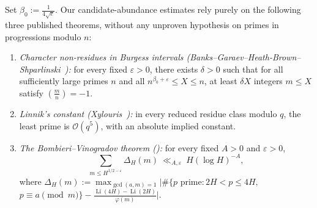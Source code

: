 \documentclass[11pt, a4paper]{article}
\theoremstyle{plain}
\theoremstyle{definition}
\newcommand{\leg}[2]{\left(\frac{#1}{#2}\right)}
\DeclareMathOperator{\Li}{Li}
\begin{document}
Set $\beta_0:=\frac{1}{4\sqrt{e}}$. Our candidate-abundance estimates rely purely on the following three published theorems, without any unproven hypothesis on primes in progressions modulo $n$:
\begin{enumerate}[1.]
    \item \emph{Character non-residues in Burgess intervals (Banks--Garaev--Heath-Brown--Shparlinski~\cite{BGHS}):} for every fixed $\varepsilon>0$, there exists $\delta>0$ such that for all sufficiently large primes $n$ and all $n^{\beta_0+\varepsilon}\le X\le n$, at least $\delta X$ integers $m\le X$ satisfy $\leg{m}{n}=-1$.
    \item \emph{Linnik's constant (Xylouris~\cite{xylouris2011}):} in every reduced residue class modulo $q$, the least prime is $\mathcal{O}(q^{5})$, with an absolute implied constant.
    \item \emph{The Bombieri--Vinogradov theorem (\cite[Thm.~17]{TaoBV}):} for every fixed $A>0$ and $\varepsilon>0$,
    \begin{equation}\label{aud:BV}
    \sum_{m\le H^{1/2-\varepsilon}}\Delta_H(m)\ \ll_{A,\varepsilon}\ H(\log H)^{-A},
    \end{equation}
    where $\Delta_H(m):=\max_{\gcd(a,m)=1}\big|\#\{p\text{ prime}:2H<p\le 4H,$\linebreak $p\equiv a\pmod m\}-\frac{\Li(4H)-\Li(2H)}{\varphi(m)}\big|$.
\end{enumerate}
\end{document}
